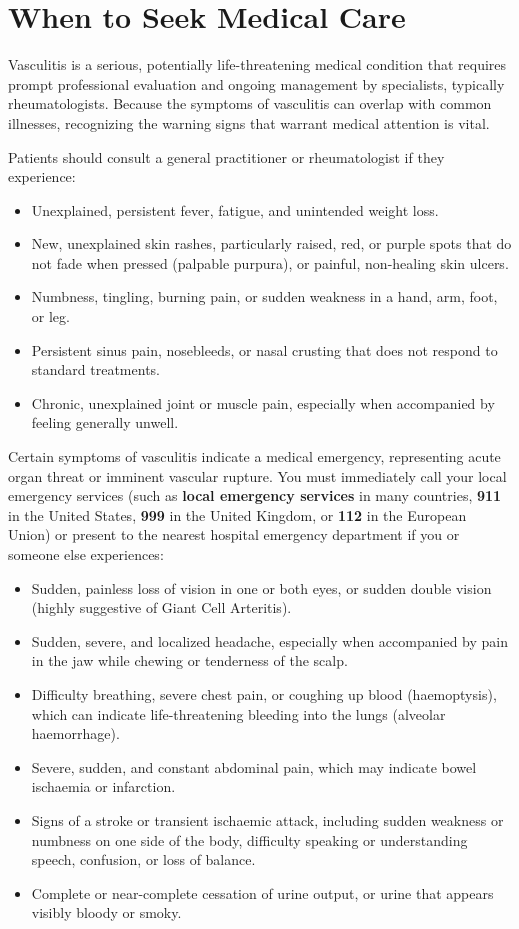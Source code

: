 \section*{When to Seek Medical Care}
Vasculitis is a serious, potentially life-threatening medical condition that requires prompt professional evaluation and ongoing management by specialists, typically rheumatologists. Because the symptoms of vasculitis can overlap with common illnesses, recognizing the warning signs that warrant medical attention is vital.

Patients should consult a general practitioner or rheumatologist if they experience:
\begin{itemize}
\item Unexplained, persistent fever, fatigue, and unintended weight loss.
\item New, unexplained skin rashes, particularly raised, red, or purple spots that do not fade when pressed (palpable purpura), or painful, non-healing skin ulcers.
\item Numbness, tingling, burning pain, or sudden weakness in a hand, arm, foot, or leg.
\item Persistent sinus pain, nosebleeds, or nasal crusting that does not respond to standard treatments.
\item Chronic, unexplained joint or muscle pain, especially when accompanied by feeling generally unwell.
\end{itemize}

Certain symptoms of vasculitis indicate a medical emergency, representing acute organ threat or imminent vascular rupture. You must immediately call your local emergency services (such as \textbf{local emergency services} in many countries, \textbf{911} in the United States, \textbf{999} in the United Kingdom, or \textbf{112} in the European Union) or present to the nearest hospital emergency department if you or someone else experiences:
\begin{itemize}
\item Sudden, painless loss of vision in one or both eyes, or sudden double vision (highly suggestive of Giant Cell Arteritis).
\item Sudden, severe, and localized headache, especially when accompanied by pain in the jaw while chewing or tenderness of the scalp.
\item Difficulty breathing, severe chest pain, or coughing up blood (haemoptysis), which can indicate life-threatening bleeding into the lungs (alveolar haemorrhage).
\item Severe, sudden, and constant abdominal pain, which may indicate bowel ischaemia or infarction.
\item Signs of a stroke or transient ischaemic attack, including sudden weakness or numbness on one side of the body, difficulty speaking or understanding speech, confusion, or loss of balance.
\item Complete or near-complete cessation of urine output, or urine that appears visibly bloody or smoky.
\end{itemize}

